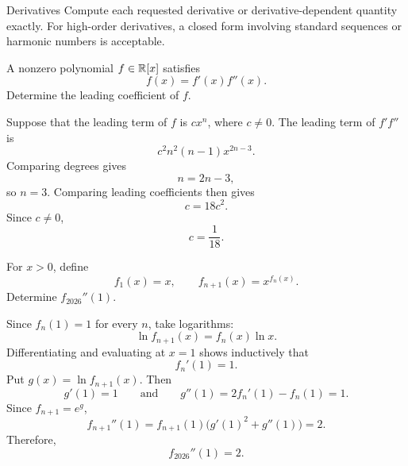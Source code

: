     \begin{expectedproblemgroup}{Derivatives}
        Compute each requested derivative or derivative-dependent quantity
        exactly. For high-order derivatives, a closed form involving standard
        sequences or harmonic numbers is acceptable.

        \begin{expectedsubproblem}[2006 HMMT]
            A nonzero polynomial $f\in\mathbb{R}[x]$ satisfies
            \[
                f(x)=f'(x)f''(x).
            \]
            Determine the leading coefficient of $f$.
        \end{expectedsubproblem}

        \begin{expectedsubsolution}
            Suppose that the leading term of $f$ is $cx^n$, where $c\neq0$. The
            leading term of $f'f''$ is
            \[
                c^2n^2(n-1)x^{2n-3}.
            \]
            Comparing degrees gives
            \[
                n=2n-3,
            \]
            so $n=3$. Comparing leading coefficients then gives
            \[
                c=18c^2.
            \]
            Since $c\neq0$,
            \[
                \boxed{c=\frac{1}{18}}.
            \]
        \end{expectedsubsolution}

        \begin{expectedsubproblem}[1993 VTRMC]
            For $x>0$, define
            \[
                f_1(x)=x,
                \qquad
                f_{n+1}(x)=x^{f_n(x)}.
            \]
            Determine $f_{2026}''(1)$.
        \end{expectedsubproblem}

        \begin{expectedsubsolution}
            Since $f_n(1)=1$ for every $n$, take logarithms:
            \[
                \ln f_{n+1}(x)=f_n(x)\ln x.
            \]
            Differentiating and evaluating at $x=1$ shows inductively that
            \[
                f_n'(1)=1.
            \]
            Put $g(x)=\ln f_{n+1}(x)$. Then
            \[
                g'(1)=1
                \qquad\text{and}\qquad
                g''(1)=2f_n'(1)-f_n(1)=1.
            \]
            Since $f_{n+1}=e^g$,
            \[
                f_{n+1}''(1)
                =
                f_{n+1}(1)\bigl(g'(1)^2+g''(1)\bigr)
                =2.
            \]
            Therefore,
            \[
                \boxed{f_{2026}''(1)=2}.
            \]
        \end{expectedsubsolution}


\end{expectedproblemgroup}
